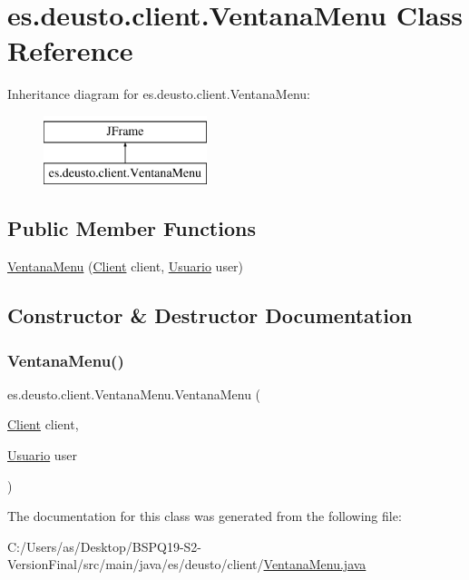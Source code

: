 \hypertarget{classes_1_1deusto_1_1client_1_1_ventana_menu}{}\section{es.\+deusto.\+client.\+Ventana\+Menu Class Reference}
\label{classes_1_1deusto_1_1client_1_1_ventana_menu}
Inheritance diagram for es.\+deusto.\+client.\+Ventana\+Menu\+:\begin{figure}[H]
\begin{center}
\leavevmode
\includegraphics[height=2.000000cm]{classes_1_1deusto_1_1client_1_1_ventana_menu}
\end{center}
\end{figure}
\subsection*{Public Member Functions}
\begin{DoxyCompactItemize}
\item 
\mbox{\hyperlink{classes_1_1deusto_1_1client_1_1_ventana_menu_a7fbd92bbd21b15738ee475e383d54de7}{Ventana\+Menu}} (\mbox{\hyperlink{classes_1_1deusto_1_1client_1_1_client}{Client}} client, \mbox{\hyperlink{classes_1_1deusto_1_1server_1_1jdo_1_1_usuario}{Usuario}} user)
\end{DoxyCompactItemize}


\subsection{Constructor \& Destructor Documentation}
\mbox{\label{classes_1_1deusto_1_1client_1_1_ventana_menu_a7fbd92bbd21b15738ee475e383d54de7}} 
\subsubsection{\texorpdfstring{VentanaMenu()}{VentanaMenu()}}
{\footnotesize\ttfamily es.\+deusto.\+client.\+Ventana\+Menu.\+Ventana\+Menu (\begin{DoxyParamCaption}\item[{\mbox{\hyperlink{classes_1_1deusto_1_1client_1_1_client}{Client}}}]{client,  }\item[{\mbox{\hyperlink{classes_1_1deusto_1_1server_1_1jdo_1_1_usuario}{Usuario}}}]{user }\end{DoxyParamCaption})}



The documentation for this class was generated from the following file\+:\begin{DoxyCompactItemize}
\item 
C\+:/\+Users/as/\+Desktop/\+B\+S\+P\+Q19-\/\+S2-\/\+Version\+Final/src/main/java/es/deusto/client/\mbox{\hyperlink{_ventana_menu_8java}{Ventana\+Menu.\+java}}\end{DoxyCompactItemize}
